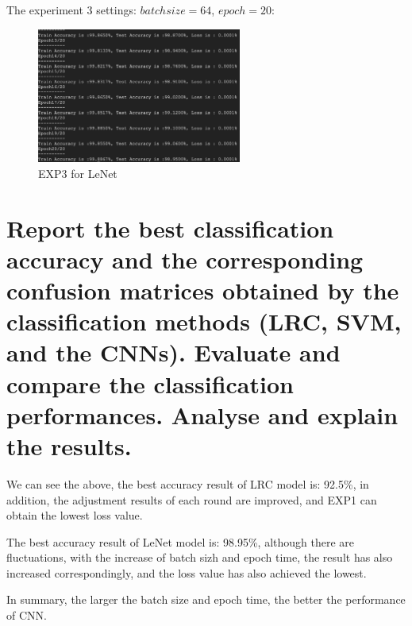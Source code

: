 \documentclass{article}
\begin{document}
The experiment 3 settings: $batch size=64$, $epoch=20$:
\begin{figure}[H]
    \caption{EXP3 for LeNet}
    \centering
    \includegraphics[width=0.6\textwidth]{lenet_3}
\end{figure}



\section{Report the best classification accuracy and the corresponding confusion matrices obtained by the
classification methods (LRC, SVM, and the CNNs). Evaluate and compare the classification performances.
Analyse and explain the results.}

We can see the above, the best accuracy result of LRC model is: 92.5\%,
in addition, the adjustment results of each round are improved, and EXP1 can obtain the lowest loss value.

The best accuracy result of LeNet model is: 98.95\%, although there are fluctuations, with the increase of batch sizh and epoch time, the result has also increased correspondingly, and the loss value has also achieved the lowest.

In summary, the larger the batch size and epoch time, the better the performance of CNN.
\end{document}
